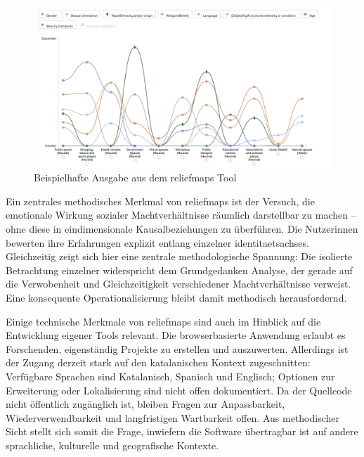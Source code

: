 \begin{figure}[htbp]
    \centering
    \includegraphics[width=\textwidth]{Arbeit/Bilder/reliefmap.png}
    \caption{Beispielhafte Ausgabe aus dem \gls{reliefmaps} Tool}
    \label{fig:relief_maps_plus_screenshot_1}
\end{figure}

Ein zentrales methodisches Merkmal von \gls{reliefmaps} ist der Versuch, die emotionale Wirkung sozialer Machtverhältnisse räumlich darstellbar zu machen -- ohne diese in eindimensionale Kausalbeziehungen zu überführen. Die Nutzer\genderstern innen bewerten ihre Erfahrungen explizit entlang einzelner \glspl{identitaetsachse}. Gleichzeitig zeigt sich hier eine zentrale methodologische Spannung: Die isolierte Betrachtung einzelner  widerspricht dem Grundgedanken  Analyse, der gerade auf die Verwobenheit und Gleichzeitigkeit verschiedener Machtverhältnisse verweist. Eine konsequente  Operationalisierung bleibt damit methodisch herausfordernd.

Einige technische Merkmale von \gls{reliefmaps} sind auch im Hinblick auf die Entwicklung eigener Tools relevant. Die browserbasierte Anwendung erlaubt es Forschenden, eigenständig Projekte zu erstellen und auszuwerten. Allerdings ist der Zugang derzeit stark auf den katalanischen Kontext zugeschnitten: Verfügbare Sprachen sind Katalanisch, Spanisch und Englisch; Optionen zur Erweiterung oder Lokalisierung sind nicht offen dokumentiert. Da der Quellcode nicht öffentlich zugänglich ist, bleiben Fragen zur Anpassbarkeit, Wiederverwendbarkeit und langfristigen Wartbarkeit offen. Aus methodischer Sicht stellt sich somit die Frage, inwiefern die Software übertragbar ist auf andere sprachliche, kulturelle und geografische Kontexte.

